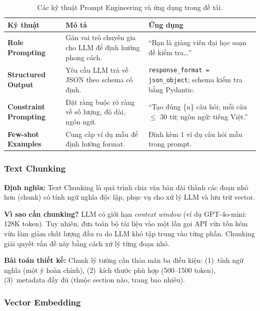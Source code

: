 \begin{table}[H]
    \centering
    \caption{Các kỹ thuật Prompt Engineering và ứng dụng trong đề tài.}
    \label{tab:prompt-tech}
    \begin{tabular}{p{3.5cm}p{6cm}p{5cm}}
        \toprule
        \textbf{Kỹ thuật} & \textbf{Mô tả} & \textbf{Ứng dụng} \\
        \midrule
        \textbf{Role Prompting} &
            Gán vai trò chuyên gia cho LLM để định hướng phong cách. &
            ``Bạn là giảng viên đại học soạn đề kiểm tra\ldots'' \\
        \midrule
        \textbf{Structured Output} &
            Yêu cầu LLM trả về JSON theo schema cố định. &
            \texttt{response\_format = json\_object}; schema kiểm tra bằng Pydantic. \\
        \midrule
        \textbf{Constraint Prompting} &
            Đặt ràng buộc rõ ràng về số lượng, độ dài, ngôn ngữ. &
            ``Tạo đúng \{n\} câu hỏi; mỗi câu $\leq$ 30 từ; ngôn ngữ: tiếng Việt.'' \\
        \midrule
        \textbf{Few-shot Examples} &
            Cung cấp ví dụ mẫu để định hướng format. &
            Đính kèm 1 ví dụ câu hỏi mẫu trong prompt. \\
        \bottomrule
    \end{tabular}
\end{table}

\subsubsection{Text Chunking}

\textbf{Định nghĩa:} Text Chunking là quá trình chia văn bản dài thành các
đoạn nhỏ hơn (chunk) có tính ngữ nghĩa độc lập, phục vụ cho xử lý LLM và
lưu trữ vector.

\textbf{Vì sao cần chunking?} LLM có giới hạn \textit{context window}
(ví dụ GPT-4o-mini: 128K token). Tuy nhiên, đưa toàn bộ tài liệu vào một
lần gọi API vừa tốn kém vừa làm giảm chất lượng đầu ra do LLM khó tập trung
vào từng phần. Chunking giải quyết vấn đề này bằng cách xử lý từng đoạn nhỏ.

\textbf{Bài toán thiết kế:} Chunk lý tưởng cần thỏa mãn ba điều kiện:
(1)~tính ngữ nghĩa (một ý hoàn chỉnh), (2)~kích thước phù hợp (500--1500
token), (3)~metadata đầy đủ (thuộc section nào, trang bao nhiêu).

\subsubsection{Vector Embedding}

